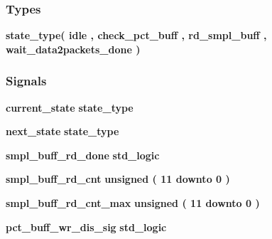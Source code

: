 \subsubsection*{Types}
 \begin{DoxyCompactItemize}
\item 
{\bfseries {\bf state\+\_\+type}{\bfseries \textcolor{vhdlchar}{(}\textcolor{vhdlchar}{ }\textcolor{vhdlchar}{idle}\textcolor{vhdlchar}{ }\textcolor{vhdlchar}{,}\textcolor{vhdlchar}{ }\textcolor{vhdlchar}{check\+\_\+pct\+\_\+buff}\textcolor{vhdlchar}{ }\textcolor{vhdlchar}{,}\textcolor{vhdlchar}{ }\textcolor{vhdlchar}{rd\+\_\+smpl\+\_\+buff}\textcolor{vhdlchar}{ }\textcolor{vhdlchar}{,}\textcolor{vhdlchar}{ }\textcolor{vhdlchar}{wait\+\_\+data2packets\+\_\+done}\textcolor{vhdlchar}{ }\textcolor{vhdlchar}{)}\textcolor{vhdlchar}{ }}} 
\end{DoxyCompactItemize}
\subsubsection*{Signals}
 \begin{DoxyCompactItemize}
\item 
{\bf current\+\_\+state} {\bfseries {\bfseries {\bf state\+\_\+type}} \textcolor{vhdlchar}{ }} 
\item 
{\bf next\+\_\+state} {\bfseries {\bfseries {\bf state\+\_\+type}} \textcolor{vhdlchar}{ }} 
\item 
{\bf smpl\+\_\+buff\+\_\+rd\+\_\+done} {\bfseries \textcolor{comment}{std\+\_\+logic}\textcolor{vhdlchar}{ }} 
\item 
{\bf smpl\+\_\+buff\+\_\+rd\+\_\+cnt} {\bfseries \textcolor{comment}{unsigned}\textcolor{vhdlchar}{ }\textcolor{vhdlchar}{(}\textcolor{vhdlchar}{ }\textcolor{vhdlchar}{ } \textcolor{vhdldigit}{11} \textcolor{vhdlchar}{ }\textcolor{keywordflow}{downto}\textcolor{vhdlchar}{ }\textcolor{vhdlchar}{ } \textcolor{vhdldigit}{0} \textcolor{vhdlchar}{ }\textcolor{vhdlchar}{)}\textcolor{vhdlchar}{ }} 
\item 
{\bf smpl\+\_\+buff\+\_\+rd\+\_\+cnt\+\_\+max} {\bfseries \textcolor{comment}{unsigned}\textcolor{vhdlchar}{ }\textcolor{vhdlchar}{(}\textcolor{vhdlchar}{ }\textcolor{vhdlchar}{ } \textcolor{vhdldigit}{11} \textcolor{vhdlchar}{ }\textcolor{keywordflow}{downto}\textcolor{vhdlchar}{ }\textcolor{vhdlchar}{ } \textcolor{vhdldigit}{0} \textcolor{vhdlchar}{ }\textcolor{vhdlchar}{)}\textcolor{vhdlchar}{ }} 
\item 
{\bf pct\+\_\+buff\+\_\+wr\+\_\+dis\+\_\+sig} {\bfseries \textcolor{comment}{std\+\_\+logic}\textcolor{vhdlchar}{ }} 
\end{DoxyCompactItemize}


